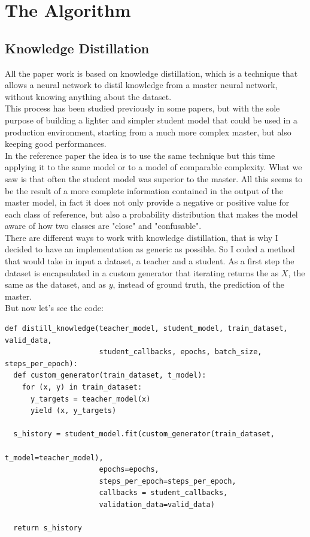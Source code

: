 \section{The Algorithm}
\subsection{Knowledge Distillation}
All the paper work is based on knowledge distillation, which is a technique that allows a neural network to distil knowledge from a master neural network, without knowing anything about the dataset.\\ 
This process has been studied previously in some papers\cite{kd}\cite{fokd}\cite{tkd}, but with the sole purpose of building a lighter and simpler student model that could be used in a production environment, starting from a much more complex master, but also keeping good performances.\\
In the reference paper the idea is to use the same technique but this time applying it to the same model or to a model of comparable complexity. What we saw is that often the student model was superior to the master. All this seems to be the result of a more complete information contained in the output of the master model, in fact it does not only provide a negative or positive value for each class of reference, but also a probability distribution that makes the model aware of how two classes are "close" and "confusable".\\
There are different ways to work with knowledge distillation, that is why I decided to have an implementation as generic as possible. So I coded a method that would take in input a dataset, a teacher and a student. As a first step the dataset is encapsulated in a custom generator that iterating returns the as $X$, the same as the dataset, and as $y$, instead of ground truth, the prediction of the master.\\
But now let's see the code:
\lstset{language=Python}
\lstset{frame=lines}
\lstset{basicstyle=\footnotesize}
\begin{lstlisting}
def distill_knowledge(teacher_model, student_model, train_dataset, valid_data, 
                      student_callbacks, epochs, batch_size, steps_per_epoch):
  def custom_generator(train_dataset, t_model):
    for (x, y) in train_dataset:
      y_targets = teacher_model(x)
      yield (x, y_targets)

  s_history = student_model.fit(custom_generator(train_dataset, 
                                                 t_model=teacher_model),             
                      epochs=epochs,
                      steps_per_epoch=steps_per_epoch,
                      callbacks = student_callbacks,
                      validation_data=valid_data)

  return s_history
\end{lstlisting}
\newpage
